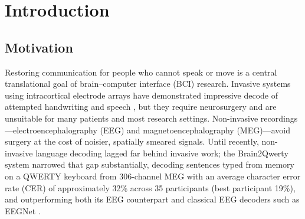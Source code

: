 \documentclass[11pt,a4paper]{report}
\begin{document}
\begin{abstract}
The central finding is methodological as much as architectural: 80\% of the
initial 12.7-point character-error-rate (CER) gap between Mamba-2 and the
Transformer (0.412 vs.\ 0.285) was closed by learning-rate re-tuning alone,
and the re-tuned Transformer control also improved (0.285\,$\to$\,0.246),
demonstrating that comparisons performed with hyperparameters tuned for the
incumbent architecture systematically misattribute optimisation sensitivity to
representational capacity. In the continuous regime, both Mamba variants
outperformed the Conformer baseline by $\approx$16 percentage points of word
error rate (WER)---a paired bootstrap over 10{,}000 resamples of the 62
held-out sentences confirms significance (bootstrap $p<10^{-4}$, Wilcoxon
$p\leq0.002$) with moderate effect sizes (Cohen's $d_z$ 0.43--0.62).
Crucially, pre-decoder encoder error is statistically indistinguishable
between BiMamba-2 and the Conformer, localising the Mamba advantage to the
curriculum's alignment-and-rescoring stages rather than the encoder---while
the Mamba-3 hybrid used 27.4\% fewer parameters than the Conformer. We report all headline comparisons with bootstrap
confidence intervals, Wilcoxon signed-rank tests, and effect sizes, and we
explicitly separate statistically meaningful differences from ranking
variations inside the seed-noise band ($<0.01$ CER). The results support a
hybrid architecture---Mamba layers for the bulk of the sequence, a small
number of attention layers for representational headroom---as the design
template for scaling non-invasive brain-to-text decoding to continuous
streams.
\end{abstract}

\tableofcontents

\chapter{Introduction}

\section{Motivation}
Restoring communication for people who cannot speak or move is a central
translational goal of brain--computer interface (BCI) research. Invasive
systems using intracortical electrode arrays have demonstrated impressive
decode of attempted handwriting and speech
\citep{willett2021handwriting}, but they require neurosurgery and are
unsuitable for many patients and most research settings. Non-invasive
recordings---electroencephalography (EEG) and magnetoencephalography
(MEG)---avoid surgery at the cost of noisier, spatially smeared signals.
Until recently, non-invasive language decoding lagged far behind invasive
work; the Brain2Qwerty system \citep{levy2025brain2qwerty} narrowed that gap
substantially, decoding sentences typed from memory on a QWERTY keyboard from
306-channel MEG with an average character error rate (CER) of approximately
32\% across 35 participants (best participant 19\%), and outperforming both
its EEG counterpart and classical EEG decoders such as EEGNet
\citep{lawhern2018eegnet}.
\end{document}
